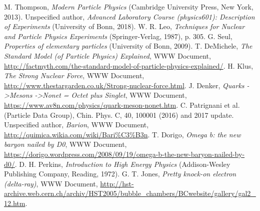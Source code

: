 \documentclass[twocolumn]{article}
\begin{document}
\begin{thebibliography}{9}
M. Thompson, \textsl{Modern Particle Physics} (Cambridge University Press, New York, 2013).
Unspecified author, \textsl{Advanced Laboratory Course (physics601): Description of Experiments} (University of Bonn, 2018).
W. R. Leo, \textsl{Techniques for Nuclear and Particle Physics Experiments} (Springer-Verlag, 1987), p. 305.
G. Seul, \textsl{Properties of elementary particles} (University of Bonn, 2009).
T. DeMichele, \textit{The Standard Model (of Particle Physics) Explained}, WWW Document, \url{http://factmyth.com/the-standard-model-of-particle-physics-explained/}.
H. Klus, \textit{The Strong Nuclear Force}, WWW Document, \url{http://www.thestargarden.co.uk/Strong-nuclear-force.html}.
J. Denker, \textit{Quarks -\textgreater Mesons -\textgreater Nonet = Octet plus Singlet}, WWW Document, \url{https://www.av8n.com/physics/quark-meson-nonet.htm}.
C. Patrignani et al. (Particle Data Group), Chin. Phys. C, 40, 100001 (2016) and 2017 update.
Unspecified author, \textit{Barion}, WWW Document, \url{http://quimica.wikia.com/wiki/Bari\%C3\%B3n}.
T. Dorigo, \textit{Omega b: the new baryon nailed by D0}, WWW Document, \url{https://dorigo.wordpress.com/2008/09/19/omega-b-the-new-baryon-nailed-by-d0/}.
D. H. Perkins, \textsl{Introduction to High Energy Physics} (Addison-Wesley Publishing Company, Reading, 1972).
G. T. Jones, \textsl{Pretty knock-on electron (delta-ray)}, WWW Document, \url{http://hst-archive.web.cern.ch/archiv/HST2005/bubble_chambers/BCwebsite/gallery/gal2_12.htm}.


\iffalse
\bibitem{book}
K. Siegbahn, \textsl{Alpha-, beta-, and gamma-ray spectroscopy, Vol. 2} (North Holland Publishing Company, Amsterdam, 1965).
 \bibitem{link}
 W. U. Boeglin, \textit{Scintillation Detectors}, WWW Document, \url{http://wanda.fiu.edu/teaching/courses/Modern_lab_manual/scintillator.html}.
\bibitem{pdf_on_website}
Unspecified author, \textsl{Gamma Ray Spectroscopy} (University of Florida, 2013), \url{https://www.phys.ufl.edu/courses/phy4803L/group_I/gamma_spec/gamspec.pdf}.
\bibitem{cfd}
E. Ermis and C. Celiktas, International Journal Of Instrumentation Science 1, (2013), pp.54-62.
\bibitem{signal}
M. Nakhostin, \textsl{Signal Processing for Radiation Detectors} (John Wiley $\&$ Sons, 2018), p. 298\footnote{Relevant pages (chapter 6) available for preview under\\ \url{https://books.google.de/books?id=Lrg4DwAAQBAJ}}.
\bibitem{meliss}
A. C. Melissinos, J. Napolitano, \textsl{Experiments in Modern Physics, 2\textsuperscript{nd} edition} (Academic Press, San Diego, 2003), pp 419-21.
\fi
\end{thebibliography}
\end{document}
